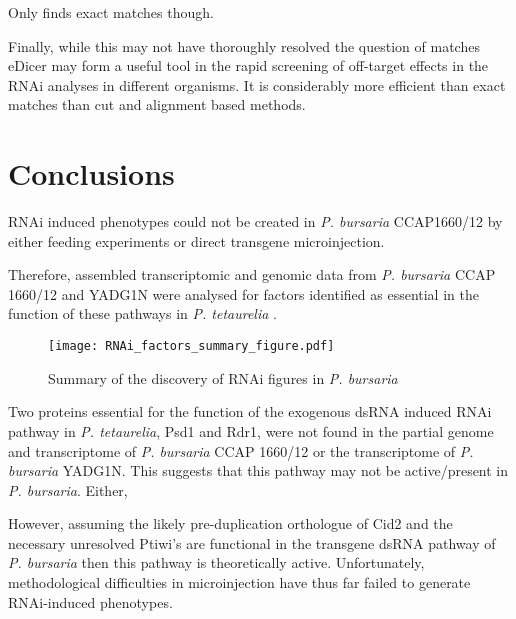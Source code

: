 Only finds exact matches though.




Finally, while this may not have thoroughly resolved the question of matches
eDicer may form a useful tool in the rapid screening of off-target effects
in the RNAi analyses in different organisms.   It is considerably
more efficient than exact matches 
than cut and alignment based methods. 





\section{Conclusions}

RNAi induced phenotypes could not be created in \textit{P. bursaria} CCAP1660/12
by either feeding experiments or direct transgene microinjection. 

Therefore, assembled transcriptomic and genomic data from \textit{P. bursaria}
CCAP 1660/12 and YADG1N were analysed for factors identified as essential in the function
of these pathways in \textit{P. tetaurelia} \citep{Marker2014}. 

\begin{figure}
    \texttt{[image: RNAi\_factors\_summary\_figure.pdf]}
    \caption[Summary of RNAi Factors Presence]{Summary of the discovery
    of RNAi figures in \textit{P. bursaria}}
    \label{fig:rnai_summary}
\end{figure}

Two proteins essential for the function of the exogenous dsRNA induced
RNAi pathway in \textit{P. tetaurelia}, Psd1 and Rdr1, were not found in the partial genome and transcriptome 
of \textit{P. bursaria} CCAP 1660/12 or the transcriptome of \textit{P. bursaria} YADG1N.
This suggests that this pathway may not be active/present in \textit{P. bursaria}.
Either, 


However, assuming the likely pre-duplication orthologue of Cid2 and the necessary 
unresolved Ptiwi's are functional
in the transgene dsRNA pathway of \textit{P. bursaria}
then this pathway is theoretically active.  Unfortunately, methodological
difficulties in microinjection have thus far failed to generate RNAi-induced
phenotypes.
